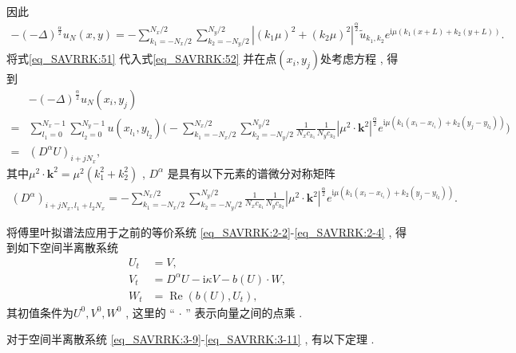 因此
\begin{align}\label{eq_SAVRRK:52}
-(-\Delta)^{\frac{\alpha}{2}} u_{N}\left(x , y\right)=-\sum\limits_{k_{1}=-N_{x} / 2}^{N_{x} / 2} \sum\limits_{k_{2}=-N_{y} / 2}^{N_{y} / 2}\left|\left(k_{1} \mu\right)^{2}+\left(k_{2} \mu\right)^{2}\right|^{\frac{\alpha}{2}} \tilde{u}_{k_{1} , k_{2}} e^{\mathrm{i}\mu\left( k_{1} (x+L)+k_{2}(y+L)\right)} . 
\end{align}
将式\eqref{eq_SAVRRK:51} 代入式\eqref{eq_SAVRRK:52} 并在点$(x_i , y_j)$处考虑方程 , 得到
\begin{align}
&-(-\Delta)^{\frac{\alpha}{2}} u_{N}\left(x_{i} , y_{j}\right)\nonumber\\
=&\sum\limits_{l_{1}=0}^{N_{x}-1} \sum\limits_{l_{2}=0}^{N_{y}-1}u(x_{l_{1}} , y_{l_{2}})\Big(-\sum\limits_{k_{1}=-N_{x} / 2}^{N_{x} / 2} \sum\limits_{k_{2}=-N_{y} / 2}^{N_{y} / 2} \frac{1}{N_{x} c_{k_{1}}} \frac{1}{N_{y} c_{k_{2}}}\left|\mu^{2} \cdot \mathbf{k}^{2}\right|^{\frac{\alpha}{2}} e^{\mathrm{i} \mu\left(k_{1}\left(x_{i}-x_{l_{1}}\right)+k_{2}\left(y_{j}-y_{l_{2}}\right)\right)}\Big)\nonumber\\
=&\left(D^{\alpha}U\right)_{i+j N_{x}} , \label{eq_SAVRRK:53}
\end{align}
其中$\mu^{2} \cdot \mathbf{k}^{2}=\mu^{2}\left(k_{1}^{2}+k_{2}^{2}\right)$ , $D^{\alpha}$ 是具有以下元素的谱微分对称矩阵
\begin{align}\label{eq_SAVRRK:54}
\left(D^{\alpha}\right)_{i+j N_{x} , l_{1}+l_{2} N_{x}}=-\sum\limits_{k_{1}=-N_{x} / 2}^{N_{x} / 2} \sum\limits_{k_{2}=-N_{y} / 2}^{N_{y} / 2}\frac{1}{N_{x} c_{k_{1}}} \frac{1}{N_{y} c_{k_{2}}}\left|\mu^{2} \cdot \mathbf{k}^{2}\right|^{\frac{\alpha}{2}} e^{\mathrm{i}\mu\left(k_{1}\left(x_{i}-x_{l_{1}}\right)+k_{2}\left(y_{j}-y_{l_{2}}\right)\right)} . 
\end{align}

将傅里叶拟谱法应用于之前的等价系统 \eqref{eq_SAVRRK:2-2}-\eqref{eq_SAVRRK:2-4} , 得到如下空间半离散系统
\begin{align}
 U_t&=V , \label{eq_SAVRRK:3-9}\\
 V_t&=D^{\alpha} U-\mathrm{i}\kappa V- b(U) \cdot W , \label{eq_SAVRRK:3-10}\\
 W_t&=\operatorname{Re}\left(b(U) , U_t\right) , \label{eq_SAVRRK:3-11}
\end{align}
其初值条件为$U^0 , V^0 , W^0$ , 这里的 “ $\cdot$ ” 表示向量之间的点乘 . 

对于空间半离散系统 \eqref{eq_SAVRRK:3-9}-\eqref{eq_SAVRRK:3-11} , 有以下定理 . 

